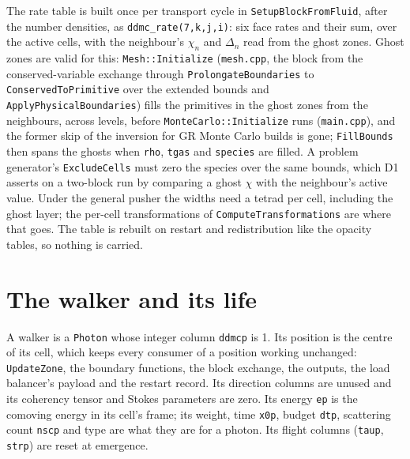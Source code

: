 \documentclass[11pt]{article}
\begin{document}
The rate table is built once per transport cycle in \texttt{SetupBlockFromFluid},
after the number densities, as \texttt{ddmc\_rate(7,k,j,i)}: six face rates and
their sum, over the active cells, with the neighbour's $\chi_n$ and $\Delta_n$ read from
the ghost zones.  Ghost zones are valid for this: \texttt{Mesh::Initialize}
(\texttt{mesh.cpp}, the block from the conserved-variable exchange through
\texttt{ProlongateBoundaries} to \texttt{ConservedToPrimitive} over the extended
bounds and \texttt{ApplyPhysicalBoundaries}) fills the primitives in the ghost zones
from the neighbours, across levels, before \texttt{MonteCarlo::Initialize} runs
(\texttt{main.cpp}), and the former skip of the inversion for GR Monte Carlo builds is
gone; \texttt{FillBounds} then spans the ghosts when \texttt{rho}, \texttt{tgas} and
\texttt{species} are filled.  A problem generator's \texttt{ExcludeCells} must zero
the species over the same bounds, which D1 asserts on a two-block run by comparing a
ghost $\chi$ with the neighbour's active value.  Under the general pusher the widths
need a tetrad per cell, including the ghost layer; the per-cell transformations of
\texttt{ComputeTransformations} are where that goes.  The table is rebuilt on restart
and redistribution like the opacity tables, so nothing is carried.

\section{The walker and its life}
\label{sec:walker}

A walker is a \texttt{Photon} whose integer column \texttt{ddmcp} is 1.
Its position is the centre of its cell, which keeps every consumer of a position
working unchanged: \texttt{UpdateZone}, the boundary functions, the block exchange, the
outputs, the load balancer's payload and the restart record.  Its direction columns
are unused and its coherency tensor and Stokes parameters are zero.  Its energy
\texttt{ep} is the comoving energy in its cell's frame; its weight, time
\texttt{x0p}, budget \texttt{dtp}, scattering count \texttt{nscp} and type are what
they are for a photon.  Its flight columns (\texttt{taup}, \texttt{strp}) are reset
at emergence.
\end{document}
